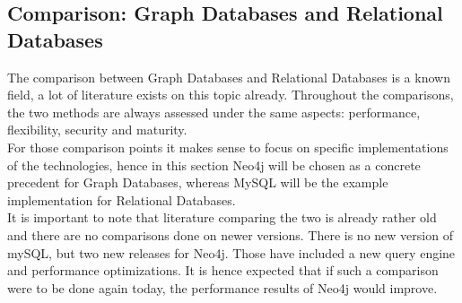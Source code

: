 \subsection{Comparison: Graph Databases and Relational Databases} \label{section:comparison}
The comparison between Graph Databases and Relational Databases is a known field, a lot of literature exists on this topic already. Throughout the comparisons, the two methods are always assessed under the same aspects: performance, flexibility, security and maturity. \\
For those comparison points it makes sense to focus on specific implementations of the technologies, hence in this section Neo4j will be chosen as a concrete precedent for Graph Databases, whereas MySQL will be the example implementation for Relational Databases. \\
It is important to note that literature comparing the two is already rather old and there are no comparisons done on newer versions. There is no new version of mySQL, but two new releases for Neo4j. Those have included a new query engine and performance optimizations. It is hence expected that if such a comparison were to be done again today, the performance results of Neo4j would improve.

